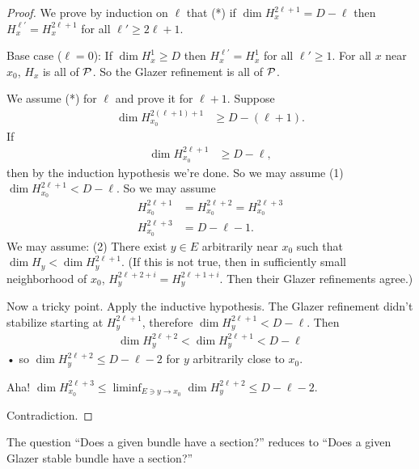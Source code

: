 \begin{proof}
We prove by induction on $\ell$ that (*) if $\dim H^{2\ell+1}_x = D-\ell$ then $H_x^{\ell'}=H_x^{2\ell+1}$ for all $\ell'\ge 2\ell+1$. 

Base case ($\ell=0$): If $\dim H_x^1\ge D$ then $H_x^{\ell'} = H_x^1$ for all $\ell'\ge 1$. For all $x$ near $x_0$, $H_x$ is all of $\cal P$. So the Glazer refinement is all of $\cal P$.

We assume (*) for $\ell$ and prove it for $\ell+1$. Suppose
\begin{align}
\dim H_{x_0}^{2(\ell+1)+1} & \ge D-(\ell+1).
\end{align}
If 
\begin{align}
\dim H_{x_0}^{2\ell+1} &\ge D-\ell, 
\end{align}
then by the induction hypothesis we're done. So we may assume (1) $\dim H_{x_0}^{2\ell+1}<D-\ell$. So we may assume
\begin{align}
H_{x_0}^{2\ell+1} &= H_{x_0}^{2\ell+2}
= H_{x_0}^{2\ell+3}\\
H_{x_0}^{2\ell + 3} &=D-\ell-1.
\end{align}
We may assume: (2)
There exist $y\in E$ arbitrarily near $x_0$ such that $\dim H_y< \dim H_y^{2\ell+1}$.
(If this is  not true, then in sufficiently small neighborhood  of $x_0$, $H_y^{2\ell+2+i}=H_y^{2\ell+1+i}$. Then their Glazer refinements agree.)

Now a tricky point. Apply the inductive hypothesis. The Glazer refinement didn't stabilize starting at $H_y^{2\ell+1}$, therefore $\dim H_y^{2\ell+1}<D-\ell$.
Then 
\begin{align}
\dim H_y^{2\ell+2} < \dim H_y^{2\ell+1}<D-\ell
\end{align}•
so $\dim H_y^{2\ell+2} \le D-\ell-2$ for $y$ arbitrarily close to $x_0$. 

Aha! $\dim H_{x_0}^{2\ell+3}\le \liminf_{E\ni y\to x_0} \dim H_y^{2\ell+2}\le D-\ell-2$. 

Contradiction. %
\end{proof}

The question ``Does a given bundle have a section?'' reduces to ``Does a given Glazer stable bundle have a section?''

